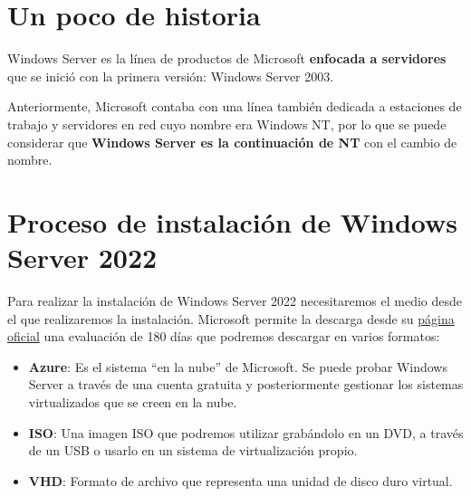 \chapter{Un poco de historia}

Windows Server es la línea de productos de Microsoft \textbf{enfocada a servidores} que se inició con la primera versión: Windows Server 2003.

Anteriormente, Microsoft contaba con una línea también dedicada a estaciones de trabajo y servidores en red cuyo nombre era Windows NT, por lo que se puede considerar que \textbf{Windows Server es la continuación de NT} con el cambio de nombre.


\chapter{Proceso de instalación de Windows Server 2022}
Para realizar la instalación de Windows Server 2022 necesitaremos el medio desde el que realizaremos la instalación. Microsoft permite la descarga desde su \href{https://www.microsoft.com/es-es/evalcenter/evaluate-windows-server-2022}{página oficial} una evaluación de 180 días que podremos descargar en varios formatos:

\begin{itemize}
    \item \textbf{Azure}: Es el sistema “en la nube” de Microsoft. Se puede probar Windows Server a través de una cuenta gratuita y posteriormente gestionar los sistemas virtualizados que se creen en la nube.
    \item \textbf{ISO}: Una imagen ISO que podremos utilizar grabándolo en un DVD, a través de un USB o usarlo en un sistema de virtualización propio.
    \item \textbf{VHD}: Formato de archivo que representa una unidad de disco duro virtual.
\end{itemize}

